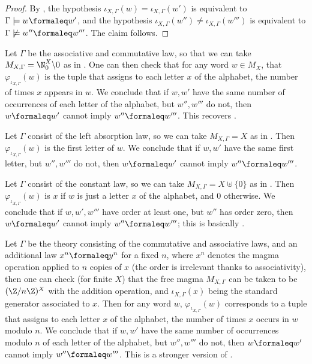 \begin{proof}
  By , the hypothesis $\iota_{X,\Gamma}(w) = \iota_{X,\Gamma}(w')$ is equivalent to $\Gamma \models w \formaleq w'$, and the hypothesis $\iota_{X,\Gamma}(w'') \neq \iota_{X,\Gamma}(w''')$ is equivalent to $\Gamma \not\models w'' \formaleq w'''$. The claim follows.
\end{proof}

\begin{example}
  Let $\Gamma$ be the associative and commutative law, so that we can take $M_{X,\Gamma} = \N_0^X \backslash 0$ as in . One can then check that for any word $w \in M_X$, that $\varphi_{\iota_{X,\Gamma}}(w)$ is the tuple that assigns to each letter $x$ of the alphabet, the number of times $x$ appears in $w$. We conclude that if $w,w'$ have the same number of occurrences of each letter of the alphabet, but $w'', w'''$ do not, then $w \formaleq w'$ cannot imply $w'' \formaleq w'''$. This recovers .
\end{example}

\begin{example}
  Let $\Gamma$ consist of the left absorption law, so we can take $M_{X,\Gamma} = X$ as in . Then $\varphi_{\iota_{X,\Gamma}}(w)$ is the first letter of $w$. We conclude that if $w,w'$ have the same first letter, but $w'', w'''$ do not, then $w \formaleq w'$ cannot imply $w'' \formaleq w'''$.
\end{example}

\begin{example}
  Let $\Gamma$ consist of the constant law, so we can take $M_{X,\Gamma} = X \uplus \{0\}$ as in . Then $\varphi_{\iota_{X,\Gamma}}(w)$ is $x$ if $w$ is just a letter $x$ of the alphabet, and $0$ otherwise. We conclude that if $w,w', w'''$ have order at least one, but $w''$ has order zero, then $w \formaleq w'$ cannot imply $w'' \formaleq w'''$; this is basically .
\end{example}

\begin{example}
  Let $\Gamma$ be the theory consisting of the commutative and associative laws, and an additional law $x^n \formaleq y^n$ for a fixed $n$, where $x^n$ denotes the magma operation applied to $n$ copies of $x$ (the order is irrelevant thanks to associativity), then one can check (for finite $X$) that the free magma $M_{X,\Gamma}$ can be taken to be $(\Z/n\Z)^X$ with the addition operation, and $\iota_{X,\Gamma}(x)$ being the standard generator associated to $x$. Then for any word $w$, $\varphi_{\iota_{X,\Gamma}}(w)$ corresponds to a tuple that assigns to each letter $x$ of the alphabet, the number of times $x$ occurs in $w$ modulo $n$. We conclude that if $w,w'$ have the same number of occurrences modulo $n$ of each letter of the alphabet, but $w'', w'''$ do not, then $w \formaleq w'$ cannot imply $w'' \formaleq w'''$. This is a stronger version of .
\end{example}

